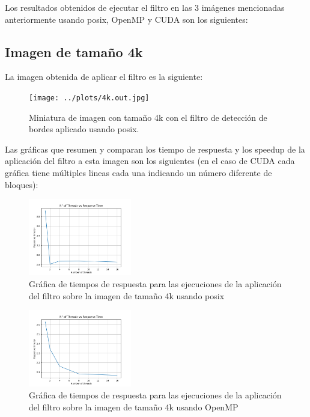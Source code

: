 Los resultados obtenidos de ejecutar el filtro en las 3 imágenes mencionadas anteriormente usando posix, OpenMP y CUDA son los siguientes:

\subsection{Imagen de tamaño 4k}

La imagen obtenida de aplicar el filtro es la siguiente:

\begin{figure}[H]
    \centering
    \texttt{[image: ../plots/4k.out.jpg]}
    \caption{Miniatura de imagen con tamaño 4k con el filtro de detección de bordes aplicado usando posix.}
\end{figure}

Las gráficas que resumen y comparan los tiempo de respuesta y los speedup de la aplicación del filtro a esta imagen son los siguientes (en el caso de CUDA cada gráfica tiene múltiples lineas cada una indicando un número diferente de bloques):

\begin{figure}[H]
    \centering
    \includegraphics[width=0.4\textwidth]{../plots/4k_response_time.png}
    \caption{Gráfica de tiempos de respuesta para las ejecuciones de la aplicación del filtro sobre la imagen de tamaño 4k usando posix}
\end{figure}

\begin{figure}[H]
    \centering
    \includegraphics[width=0.4\textwidth]{../plots/omp_4k_response_time.png}
    \caption{Gráfica de tiempos de respuesta para las ejecuciones de la aplicación del filtro sobre la imagen de tamaño 4k usando OpenMP}
\end{figure}

